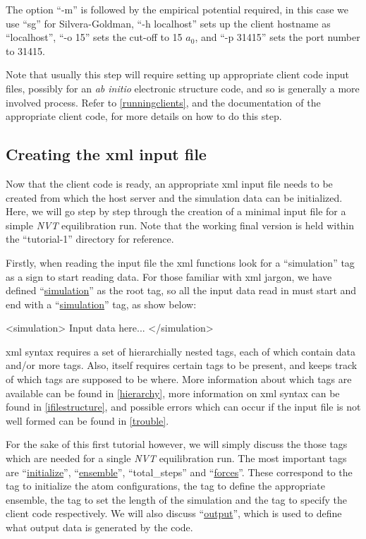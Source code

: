 \documentclass[11pt,english,fleqn]{report}
\newenvironment{code}{%
\footnotesize 
\verbatim
}{
\endverbatim
\normalsize
}
\begin{document}
The option {}``-m'' is followed by the empirical potential required,
in this case we use {}``sg'' for Silvera-Goldman, 
{}``-h localhost'' sets up the client hostname
as {}``localhost'', {}``-o 15'' sets the cut-off to 15 \(a_0\), 
and {}``-p 31415'' sets the port number to 31415. 

Note that usually this step will require setting up appropriate
client code input files, possibly for an \emph{ab initio} electronic
structure code, and so is generally a more involved process. Refer
to \ref{runningclients}, and the documentation of the appropriate
client code, for more details on how to do this step.


\subsection{Creating the xml input file}

Now that the client code is ready, an appropriate xml input file needs
to be created from which the host server and the simulation data can
be initialized. Here, we will go step by step through the creation
of a minimal input file for a simple \emph{NVT} equilibration run. Note that
the working final version is held within the {}``tutorial-1'' directory
for reference.

Firstly, when reading the input file the \ipi xml functions look
for a {}``simulation''
tag as a sign to start reading data. For those familiar with xml jargon,
we have defined {}``\hyperref[SIMULATION]{simulation}'' as the 
root tag, so all the input data read in must start and end with a 
{}``\hyperref[SIMULATION]{simulation}'' tag, as show below:

\begin{code}
<simulation>
   Input data here...
</simulation>
\end{code}

xml syntax requires a set of hierarchially nested tags, each of which
contain data and/or more tags. Also, \ipi itself requires certain
tags to be present, and keeps track of which tags are supposed to
be where. More information about which tags are available can be found
in \ref{hierarchy}, more information on xml syntax can be found in
\ref{ifilestructure}, and possible errors which can occur if the
input file is not well formed can be found in \ref{trouble}. 

For the sake of this first tutorial however, we will simply discuss the
those tags which are needed for a single \emph{NVT} equilibration run.
The most important tags are {}``\hyperref[INITIALIZER]{initialize}'', 
{}``\hyperref[ENSEMBLE]{ensemble}'', 
{}``total\_steps'' and {}``\hyperref[FORCES]{forces}''.
These correspond to the tag to initialize the atom configurations,
the tag to define the appropriate ensemble,
the tag to set the length of the simulation and the tag to specify the 
client code respectively.
We will also discuss {}``\hyperref[OUTPUTS]{output}'', 
which is used to define what output data
is generated by the code.
\end{document}
